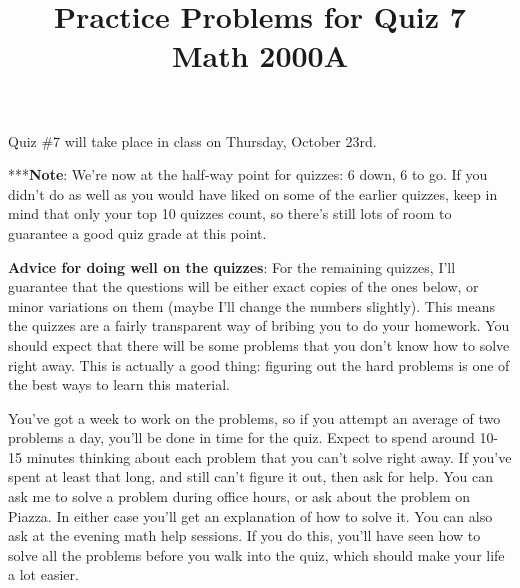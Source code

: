 \documentclass[letterpaper,12pt]{article}
\title{Practice Problems for Quiz 7\\Math 2000A}
\date{}
\begin{document}
 \maketitle
\vspace{-0.5in}

Quiz \#7 will take place in class on Thursday, October 23rd. 

***{\bf Note}: We're now at the half-way point for quizzes: 6 down, 6 to go. If you didn't do as well as you would have liked on some of the earlier quizzes, keep in mind that only your top 10 quizzes count, so there's still lots of room to guarantee a good quiz grade at this point.

{\bf Advice for doing well on the quizzes}: For the remaining quizzes, I'll guarantee that the questions will be either exact copies of the ones below, or minor variations on them (maybe I'll change the numbers slightly). This means the quizzes are a fairly transparent way of bribing you to do your homework. You should expect that there will be some problems that you don't know how to solve right away. This is actually a good thing: figuring out the hard problems is one of the best ways to learn this material. 

You've got a week to work on the problems, so if you attempt an average of two problems a day, you'll be done in time for the quiz. Expect to spend around 10-15 minutes thinking about each problem that you can't solve right away. If you've spent at least that long, and still can't figure it out, then ask for help. You can ask me to solve a problem during office hours, or ask about the problem on Piazza. In either case you'll get an explanation of how to solve it. You can also ask at the evening math help sessions. If you do this, you'll have seen how to solve all the problems before you walk into the quiz, which should make your life a lot easier.
\end{document}
